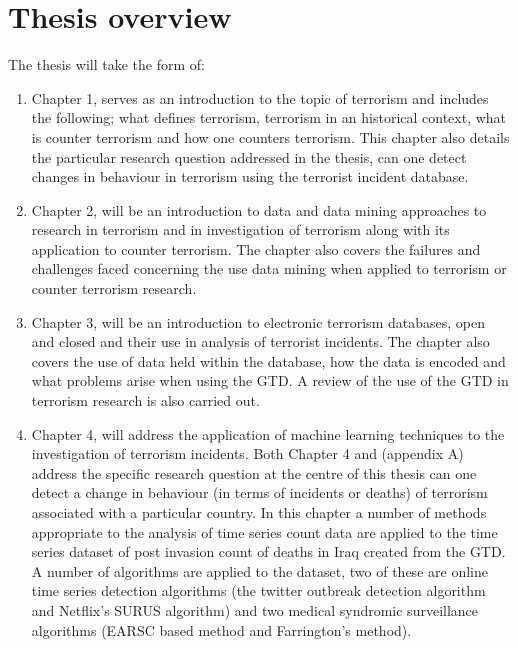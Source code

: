 \section{Thesis overview}
The thesis will take the form of:
\begin{enumerate}
\item Chapter 1, serves as an introduction to the topic of terrorism and includes the following; what defines terrorism, terrorism in an historical context, what is counter terrorism and how one counters terrorism. This chapter also details the particular research question addressed in the thesis, can one detect changes in behaviour in terrorism using the terrorist incident database. 
\item Chapter 2, will be an introduction to data and data mining approaches to research in terrorism and in investigation of terrorism along with its application to counter terrorism. The chapter also covers the failures and challenges faced concerning the use data mining when applied to terrorism or counter terrorism research.
\item Chapter 3, will be an introduction to electronic terrorism databases, open and closed and their use in analysis of terrorist incidents. The chapter also covers the use of data held within the database, how the data is encoded and what problems arise when using the GTD. A review of the use of the GTD in terrorism research is also carried out.
\item Chapter 4, will address the application of machine learning techniques to the investigation of terrorism incidents. Both Chapter 4 and (appendix A)  address the specific research question at the centre of this thesis can one detect a change in behaviour (in terms of incidents or deaths) of terrorism associated with a particular country. In this chapter a number of methods appropriate to the analysis of time series count data are applied to the time series dataset of post invasion count of deaths in Iraq created from the GTD. A number of algorithms are applied to the dataset, two of these are online time series detection algorithms (the twitter outbreak detection algorithm and Netflix's SURUS algorithm) and two medical syndromic surveillance algorithms (EARSC based method and Farrington's method). 


\end{enumerate}
